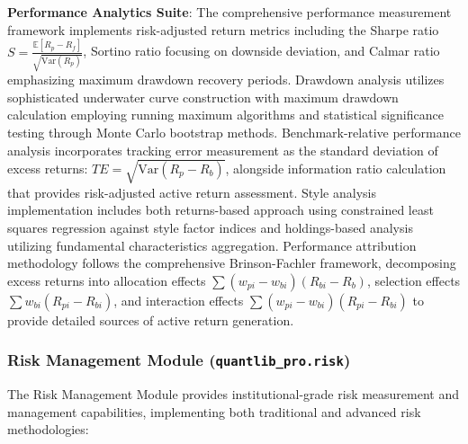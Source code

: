\documentclass[12pt,a4paper]{article}
\theoremstyle{definition}
\theoremstyle{remark}
\begin{document}
\textbf{Performance Analytics Suite}: The comprehensive performance measurement framework implements risk-adjusted return metrics including the Sharpe ratio $S = \frac{\mathbb{E}[R_p - R_f]}{\sqrt{\text{Var}(R_p)}}$, Sortino ratio focusing on downside deviation, and Calmar ratio emphasizing maximum drawdown recovery periods. Drawdown analysis utilizes sophisticated underwater curve construction with maximum drawdown calculation employing running maximum algorithms and statistical significance testing through Monte Carlo bootstrap methods. Benchmark-relative performance analysis incorporates tracking error measurement as the standard deviation of excess returns: $TE = \sqrt{\text{Var}(R_p - R_b)}$, alongside information ratio calculation that provides risk-adjusted active return assessment. Style analysis implementation includes both returns-based approach using constrained least squares regression against style factor indices and holdings-based analysis utilizing fundamental characteristics aggregation. Performance attribution methodology follows the comprehensive Brinson-Fachler framework, decomposing excess returns into allocation effects $\sum (w_{pi} - w_{bi})(R_{bi} - R_b)$, selection effects $\sum w_{bi}(R_{pi} - R_{bi})$, and interaction effects $\sum (w_{pi} - w_{bi})(R_{pi} - R_{bi})$ to provide detailed sources of active return generation.

\subsubsection{Risk Management Module (\texttt{quantlib\_pro.risk})}

The Risk Management Module provides institutional-grade risk measurement and management capabilities, implementing both traditional and advanced risk methodologies:
\end{document}
